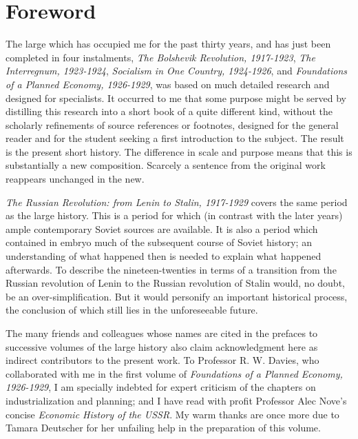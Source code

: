 \chapter*{Foreword}

The large  which has occupied me for the past thirty years, and has just been completed in four instalments, \textit{The Bolshevik Revolution, 1917-1923}, \textit{The Interregnum, 1923-1924}, \textit{Socialism in One Country, 1924-1926}, and \textit{Foundations of a Planned Economy, 1926-1929}, was based on much detailed research and designed for specialists. It occurred to me that some purpose might be served by distilling this research into a short book of a quite different kind, without the scholarly refinements of source references or footnotes, designed for the general reader and for the student seeking a first introduction to the subject. The result is the present short history. The difference in scale and purpose means that this is substantially a new composition. Scarcely a sentence from the original work reappears unchanged in the new. 

\textit{The Russian Revolution: from Lenin to Stalin, 1917-1929} covers the same period as the large history. This is a period for which (in contrast with the later years) ample contemporary Soviet sources are available. It is also a period which contained in embryo much of the subsequent course of Soviet history; an understanding of what happened then is needed to explain what happened afterwards. %
To describe the nineteen-twenties in terms of a transition from the Russian revolution of Lenin to the Russian revolution of Stalin would, no doubt, be an over-simplification. But it would personify an important historical process, the conclusion of which still lies in the unforeseeable future. 

The many friends and colleagues whose names are cited in the prefaces to successive volumes of the large history also claim acknowledgment here as indirect contributors to the present work. To Professor R. W. Davies, who collaborated with me in the first volume of \textit{Foundations of a Planned Economy, 1926-1929}, I am specially indebted for expert criticism of the chapters on industrialization and planning; and I have read with profit Professor Alec Nove's concise \textit{Economic History of the USSR}. My warm thanks are once more due to Tamara Deutscher for her unfailing help in the preparation of this volume. 

